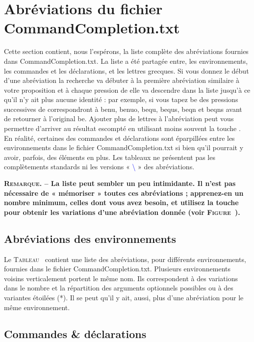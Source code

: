 \documentclass[12pt,french]{article}
\newcommand{\esc}{{\WD \symbol{82}}}
\newcommand{\fontelatex}{\ttfamily}
\newcommand{\argument}[1]{{\fontelatex#1}}
\newcommand{\com}[1]{{\fontelatex\textcolor{blue}{\textbackslash#1}}}
\begin{document}
\section*{Abréviations du fichier \textsf{CommandCompletion.txt}}

Cette section contient, nous l'espérons, la liste complète des abréviations fournies dans 
\textsf{CommandCompletion.txt}. La liste a été partagée entre, les environnements, les commandes et les 
déclarations, et les lettres grecques. Si vous donnez le début d'une abréviation la recherche va débuter à la première 
abréviation similaire à votre proposition et à chaque pression de \esc{} elle va descendre dans la liste jusqu'à ce qu'il 
n'y ait plus aucune identité : par exemple, si vous tapez \argument{be} des pressions successives de \esc{} 
correspondront à \argument{benu}, \argument{benuo}, \argument{bequ}, \argument{bequs}, \argument{beqn} et 
\argument{beqns} avant de retourner à l'original \argument{be}. Ajouter plus de lettres à l'abréviation peut vous 
permettre d'arriver au résultat escompté en utilisant moins souvent la touche \esc{}. En réalité, certaines des 
commandes et déclarations sont éparpillées entre les environnements dans le fichier 
\textsf{CommandCompletion.txt} si bien qu'il pourrait y avoir, parfois, des éléments en plus. Les tableaux ne 
présentent pas les complètements standards ni les versions  « \com{} » des abréviations.

\noindent\textbf{\textsc{Remarque}. -- La liste peut sembler un peu intimidante. Il n'est pas nécessaire de « mémoriser » toutes ces abréviations ; apprenez-en un nombre minimum, celles dont vous avez besoin, et utilisez la touche \esc{} pour obtenir les variations d'une abréviation donnée (voir \textsc{Figure}~).}

\subsection*{Abréviations des environnements}

Le \textsc{Tableau}~ contient une liste des abréviations, pour différents environnements, 
fournies dans le fichier \textsf{CommandCompletion.txt}. Plusieurs environnements voisins verticalement portent le 
même nom. Ils correspondent à des variations dans le nombre et la répartition des arguments optionnels possibles 
ou à des variantes étoilées (*). Il se peut qu'il y ait, aussi, plus d'une abréviation pour le même environnement.

\subsection*{Commandes \& déclarations}
\end{document}
